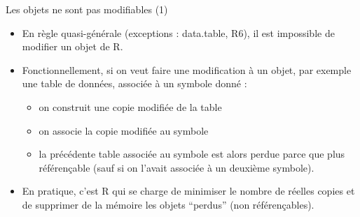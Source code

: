 \documentclass[
  ignorenonframetext,
]{beamer}
\providecommand{\tightlist}{%
  \setlength{\itemsep}{0pt}\setlength{\parskip}{0pt}}
\begin{document}
\begin{frame}{Les objets ne sont pas modifiables (1)}
\protect\hypertarget{les-objets-ne-sont-pas-modifiables-1}{}
\begin{itemize}
\tightlist
\item
  En règle quasi-générale (exceptions : data.table, R6), il est
  impossible de modifier un objet de R.
\item
  Fonctionnellement, si on veut faire une modification à un objet, par
  exemple une table de données, associée à un symbole donné :

  \begin{itemize}
  \tightlist
  \item
    on construit une copie modifiée de la table
  \item
    on associe la copie modifiée au symbole
  \item
    la précédente table associée au symbole est alors perdue parce que
    plus référençable (sauf si on l'avait associée à un deuxième
    symbole).
  \end{itemize}
\item
  En pratique, c'est R qui se charge de minimiser le nombre de réelles
  copies et de supprimer de la mémoire les objets ``perdus'' (non
  référençables).
\end{itemize}
\end{frame}
\end{document}
